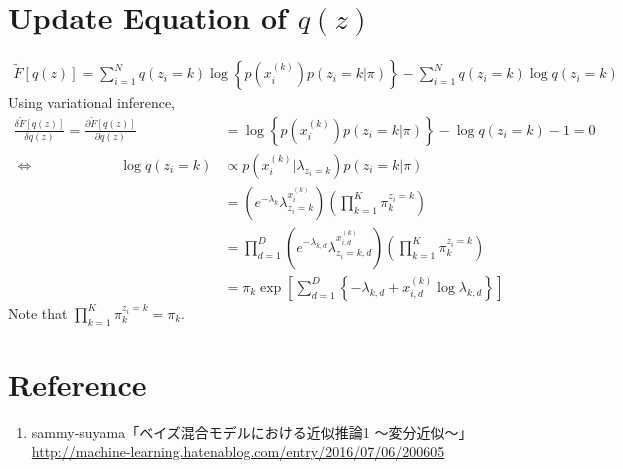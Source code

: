 \documentclass[a4paper,10.5pt,dvipdfmx]{jarticle}  %
\begin{document}
\section{Update Equation of $q(z)$}
\noindent
\begin{align}
	\widetilde{F}[q (z)] = \sum_{i=1}^{N} q(z_i=k) \log \left\{ p(x_{i}^{(k)}) p(z_i=k|\pi) \right\} - \sum_{i=1}^{N} q(z_i=k) \log q(z_i=k)
\end{align}
\noindent
Using variational inference,
\begin{align}
	\frac{\delta \widetilde{F}[q(z)]}{\delta q(z)} = \frac{\partial \widetilde{F}[q(z)]}{\partial q(z)} &= \log \left\{ p(x_{i}^{(k)}) p(z_i=k|\pi) \right\} - \log q(z_i=k) - 1 = 0\\
	\Longleftrightarrow \qquad  \qquad  \qquad \log q(z_i=k) &\propto p(x_{i}^{(k)} | \lambda_{z_i=k}) p(z_i=k | \pi)\\
&= \left( e^{-\lambda_k} \lambda_{z_i=k}^{x_{i}^{(k)}} \right) \left( \prod_{k=1}^{K} \pi_{k}^{z_i=k} \right)\\
&= \prod_{d=1}^{D} \left( e^{-\lambda_{k,d}} \lambda_{z_i=k,d}^{x_{i,d}^{(k)}} \right) \left( \prod_{k=1}^{K} \pi_{k}^{z_i=k} \right)\\
&= \pi_k \exp \left[ \sum_{d=1}^{D} \left\{ - \lambda_{k,d} + x_{i,d}^{(k)} \log \lambda_{k, d}  \right\} \right]
\end{align}
Note that $\prod_{k=1}^{K} \pi_{k}^{z_i=k} = \pi_k$.

\section*{Reference}
\begin{enumerate}
	\item sammy-suyama「ベイズ混合モデルにおける近似推論1 ～変分近似～」 \url{http://machine-learning.hatenablog.com/entry/2016/07/06/200605}
\end{enumerate}
\end{document}
